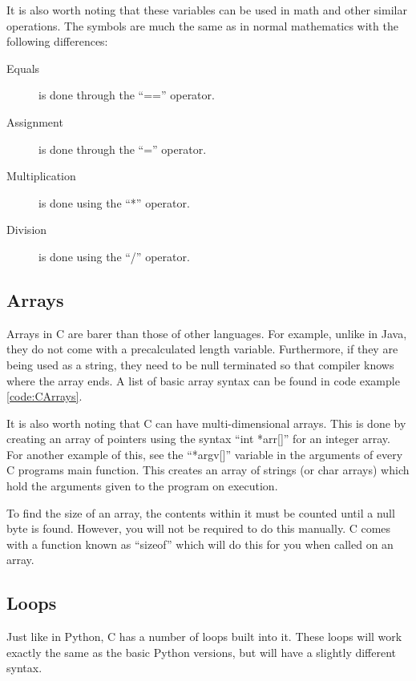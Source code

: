 			It is also worth noting that these variables can be used in math and other similar operations. 
			The symbols are much the same as in normal mathematics with the following differences:
			\begin{description}
				\item[Equals] is done through the ``=='' operator.
				\item[Assignment] is done through the ``='' operator.
				\item[Multiplication] is done using the ``*'' operator.
				\item[Division] is done using the ``/'' operator. 
			\end{description}

		\subsection{Arrays}
			Arrays in C are barer than those of other languages. 
			For example, unlike in Java, they do not come with a precalculated length variable.
			Furthermore, if they are being used as a string, they need to be null terminated so that compiler knows where the array ends. 
			A list of basic array syntax can be found in code example \ref{code:CArrays}.
			\begin{code}
				C}]{./arrays.c}
				\caption{A List of Different Array Syntax}
				\label{code:CArrays}
			\end{code}
			It is also worth noting that C can have multi-dimensional arrays. 
			This is done by creating an array of pointers using the syntax ``int *arr[]'' for an integer array. 
			For another example of this, see the ``*argv[]'' variable in the arguments of every C programs main function. 
			This creates an array of strings (or char arrays) which hold the arguments given to the program on execution. 

			To find the size of an array, the contents within it must be counted until a null byte is found. 
			However, you will not be required to do this manually. 
			C comes with a function known as ``sizeof'' which will do this for you when called on an array. 
		\subsection{Loops}
			Just like in Python, C has a number of loops built into it. 
			These loops will work exactly the same as the basic Python versions, but will have a slightly different syntax. 
			
